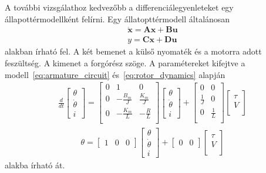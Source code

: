 A további vizsgálathoz kedvezőbb a differenciálegyenleteket egy állapottérmodellként felírni.
Egy állatopttérmodell általánosan
\begin{align}
    \dot{\bm x} = \bm A \bm x + \bm B \bm u \\
    y = \bm C \bm x + \bm D \bm u
\end{align} alakban írható fel. 
A két bemenet a külső nyomaték és a motorra adott feszültség. A kimenet a forgórész szöge.
A paramétereket kifejtve a modell~\ref{eq:armature_circuit} és~\ref{eq:rotor_dynamics} alapján
\begin{align}
    \frac{d}{dt}
    \begin{bmatrix}
        \theta \\
        \dot\theta \\
        i
    \end{bmatrix}
    =
    \begin{bmatrix}
        0 & 1 & 0 \\
        0 & -\frac{B_m}{J} & \frac{K_m}{J} \\
        0 & -\frac{K_m}{L} & -\frac{R}{L} \\
    \end{bmatrix}
    \begin{bmatrix}
        \theta \\
        \dot\theta \\
        i
    \end{bmatrix}
    +
    \begin{bmatrix}
        0 & 0 \\
        \frac{1}{J} & 0 \\
        0 & \frac{1}{L} \\
    \end{bmatrix}
    \begin{bmatrix}
        \tau \\
        V \\
    \end{bmatrix}
\end{align}
\begin{align}
    \theta = 
    \begin{bmatrix}
        1 & 0 & 0
    \end{bmatrix}
    \begin{bmatrix}
        \theta \\
        \dot\theta \\
        i
    \end{bmatrix}
    +
    \begin{bmatrix}
        0 & 0
    \end{bmatrix}
    \begin{bmatrix}
        \tau \\
        V \\
    \end{bmatrix}
\end{align}
alakba írható át. 

